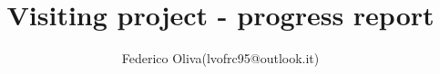 \documentclass[10pt]{article}
\begin{document}
\setlength\parindent{0pt}

\title{Visiting project - progress report}
\author{Federico Oliva(lvofrc95@outlook.it)}

\maketitle
\renewcommand*\contentsname{{}}

\tableofcontents





\newpage
{\small
	
	
}
\end{document}
